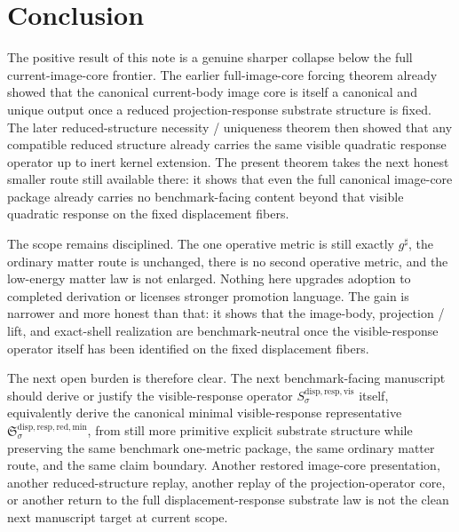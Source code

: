 \documentclass[11pt]{article}
\newcommand{\CompletedMetric}{g^{\sharp}}
\newcommand{\VisibleResponseOperator}[1]{S_{#1}^{\mathrm{disp,resp,vis}}}
\newcommand{\MinimalReducedStructure}{\mathfrak S^{\mathrm{disp,resp,red,min}}}
\begin{document}
\section{Conclusion}

The positive result of this note is a genuine sharper collapse below the full current-image-core frontier. The earlier full-image-core forcing theorem already showed that the canonical current-body image core is itself a canonical and unique output once a reduced projection-response substrate structure is fixed. The later reduced-structure necessity / uniqueness theorem then showed that any compatible reduced structure already carries the same visible quadratic response operator up to inert kernel extension. The present theorem takes the next honest smaller route still available there: it shows that even the full canonical image-core package already carries no benchmark-facing content beyond that visible quadratic response on the fixed displacement fibers.

The scope remains disciplined. The one operative metric is still exactly \(\CompletedMetric\), the ordinary matter route is unchanged, there is no second operative metric, and the low-energy matter law is not enlarged. Nothing here upgrades adoption to completed derivation or licenses stronger promotion language. The gain is narrower and more honest than that: it shows that the image-body, projection / lift, and exact-shell realization are benchmark-neutral once the visible-response operator itself has been identified on the fixed displacement fibers.

The next open burden is therefore clear. The next benchmark-facing manuscript should derive or justify the visible-response operator \(\VisibleResponseOperator{\sigma}\) itself, equivalently derive the canonical minimal visible-response representative \(\MinimalReducedStructure_{\sigma}\), from still more primitive explicit substrate structure while preserving the same benchmark one-metric package, the same ordinary matter route, and the same claim boundary. Another restored image-core presentation, another reduced-structure replay, another replay of the projection-operator core, or another return to the full displacement-response substrate law is not the clean next manuscript target at current scope.
\end{document}

